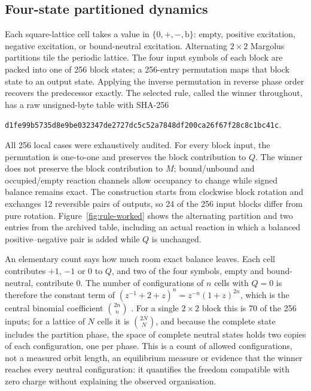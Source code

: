 \documentclass[11pt,a4paper]{article}
\newcommand{\code}[1]{\texttt{#1}}
\begin{document}
\subsection{Four-state partitioned dynamics}
Each square-lattice cell takes a value in $\{0,+,-,\mathrm b\}$: empty, positive excitation, negative excitation, or bound-neutral excitation. Alternating $2\times2$ Margolus partitions tile the periodic lattice. The four input symbols of each block are packed into one of 256 block states; a 256-entry permutation maps that block state to an output state. Applying the inverse permutation in reverse phase order recovers the predecessor exactly. The selected rule, called the winner throughout, has a raw unsigned-byte table with SHA-256
\begin{center}
\code{d1fe99b5735d8e9be032347de2727dc5c52a7848df200ca26f67f28c8c1bc41c}.
\end{center}
All 256 local cases were exhaustively audited. For every block input, the permutation is one-to-one and preserves the block contribution to $Q$. The winner does not preserve the block contribution to $M$; bound/unbound and occupied/empty reaction channels allow occupancy to change while signed balance remains exact. The construction starts from clockwise block rotation and exchanges 12 reversible pairs of outputs, so 24 of the 256 input blocks differ from pure rotation. Figure~\ref{fig:rule-worked} shows the alternating partition and two entries from the archived table, including an actual reaction in which a balanced positive--negative pair is added while $Q$ is unchanged.

An elementary count says how much room exact balance leaves. Each cell contributes $+1$, $-1$ or $0$ to $Q$, and two of the four symbols, empty and bound-neutral, contribute $0$. The number of configurations of $n$ cells with $Q=0$ is therefore the constant term of $(z^{-1}+2+z)^n=z^{-n}(1+z)^{2n}$, which is the central binomial coefficient $\binom{2n}{n}$ \citep[Chapter~5]{GrahamKnuthPatashnik1994}. For a single $2\times2$ block this is 70 of the 256 inputs; for a lattice of $N$ cells it is $\binom{2N}{N}$, and because the complete state includes the partition phase, the space of complete neutral states holds two copies of each configuration, one per phase. This is a count of allowed configurations, not a measured orbit length, an equilibrium measure or evidence that the winner reaches every neutral configuration: it quantifies the freedom compatible with zero charge without explaining the observed organisation.
\end{document}

